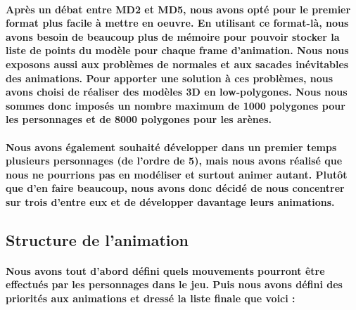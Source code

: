 \paragraph{Après un débat entre MD2 et MD5, nous avons opté pour le premier format plus facile à mettre en oeuvre.
En utilisant ce format-là, nous avons besoin de beaucoup plus de mémoire pour pouvoir stocker la liste de points du modèle pour chaque frame d'animation. Nous nous exposons aussi aux problèmes de normales et aux sacades inévitables des animations. Pour apporter une solution à ces problèmes, nous avons choisi de réaliser des modèles 3D en low-polygones. Nous nous sommes donc imposés \textbf{un nombre maximum de 1000 polygones pour les personnages} et de \textbf{8000 polygones pour les arènes}.}
\paragraph{Nous avons également souhaité développer dans un premier temps plusieurs personnages (de l'ordre de 5), mais nous avons réalisé que nous ne pourrions pas en modéliser et surtout animer autant. Plutôt que d'en faire beaucoup, nous avons donc décidé de nous \textbf{concentrer sur trois} d'entre eux et de \textbf{développer davantage leurs animations}.}


\subsection{Structure de l'animation}
\paragraph{Nous avons tout d'abord défini quels mouvements pourront être effectués par les personnages dans le jeu. Puis nous avons défini des priorités aux animations et dressé la liste finale que voici :}

